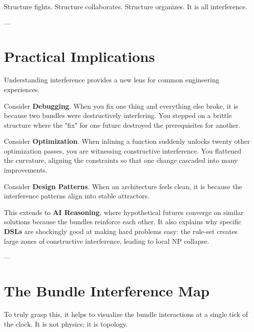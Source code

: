 Structure fights. Structure collaborates. Structure organizes. It is all interference.

---

\section{\texorpdfstring{\textbf{Practical Implications}}{12.11 --- Practical Implications}}

Understanding interference provides a new lens for common engineering experiences.

Consider \textbf{Debugging}. When you fix one thing and everything else broke, it is because two bundles were destructively interfering. You stepped on a brittle structure where the "fix" for one future destroyed the prerequisites for another.

Consider \textbf{Optimization}. When inlining a function suddenly unlocks twenty other optimization passes, you are witnessing constructive interference. You flattened the curvature, aligning the constraints so that one change cascaded into many improvements.

Consider \textbf{Design Patterns}. When an architecture feels clean, it is because the interference patterns align into stable attractors.

This extends to \textbf{AI Reasoning}, where hypothetical futures converge on similar solutions because the bundles reinforce each other. It also explains why specific \textbf{DSLs} are shockingly good at making hard problems easy: the rule-set creates large zones of constructive interference, leading to local NP collapse.

---

\section{\texorpdfstring{\textbf{The Bundle Interference Map}}{12.12 --- The Bundle Interference Map}}

To truly grasp this, it helps to visualize the bundle interactions at a single tick of the clock. It is not physics; it is topology.

